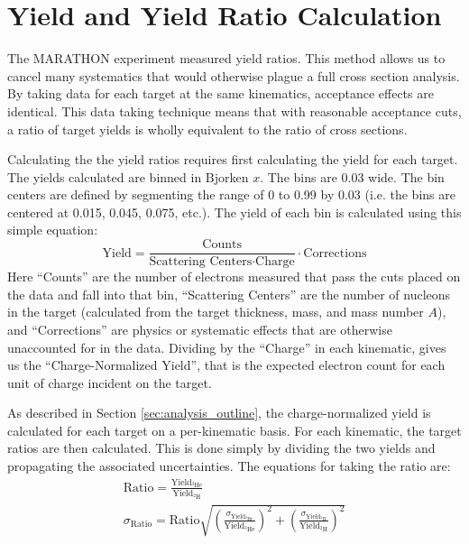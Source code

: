\section{Yield and Yield Ratio Calculation}

The MARATHON experiment measured yield ratios. This method allows us to cancel many systematics that would otherwise plague a full cross section analysis. By taking data for each target at the same kinematics, acceptance effects are identical. This data taking technique means that with reasonable acceptance cuts, a ratio of target yields is wholly equivalent to the ratio of cross sections.

Calculating the the yield ratios requires first calculating the yield for each target. The yields calculated are binned in Bjorken $x$. The bins are 0.03 wide. The bin centers are defined by segmenting the range of 0 to 0.99 by 0.03 (i.e. the bins are centered at 0.015, 0.045, 0.075, etc.). The yield of each bin is calculated using this simple equation:
\begin{equation}
	\text{Yield} = \frac{\text{Counts}}{\text{Scattering Centers} \cdot \text{Charge}} \cdot \text{Corrections}
	\label{eqn:yield}
\end{equation}
Here ``Counts'' are the number of electrons measured that pass the cuts placed on the data and fall into that bin, ``Scattering Centers'' are the number of nucleons in the target (calculated from the target thickness, mass, and mass number $A$), and ``Corrections'' are physics or systematic effects that are otherwise unaccounted for in the data. Dividing by the ``Charge'' in each kinematic, gives us the ``Charge-Normalized Yield'', that is the expected electron count for each unit of charge incident on the target.

As described in Section \ref{sec:analysis_outline}, the charge-normalized yield is calculated for each target on a per-kinematic basis. For each kinematic, the target ratios are then calculated. This is done simply by dividing the two yields and propagating the associated uncertainties. The equations for taking the ratio are:
\begin{align}
	\text{Ratio} = \frac{\text{Yield}_{^3\text{He}}}{\text{Yield}_{^2\text{H}}} \\
	\sigma_{\text{Ratio}} = \text{Ratio}\sqrt{\left(\frac{\sigma_{\text{Yield}_{^3\text{He}}}}{\text{Yield}_{^3\text{He}}}\right)^2 + \left(\frac{\sigma_{\text{Yield}_{^2\text{H}}}}{\text{Yield}_{^2\text{H}}}\right)^2}
\end{align}

